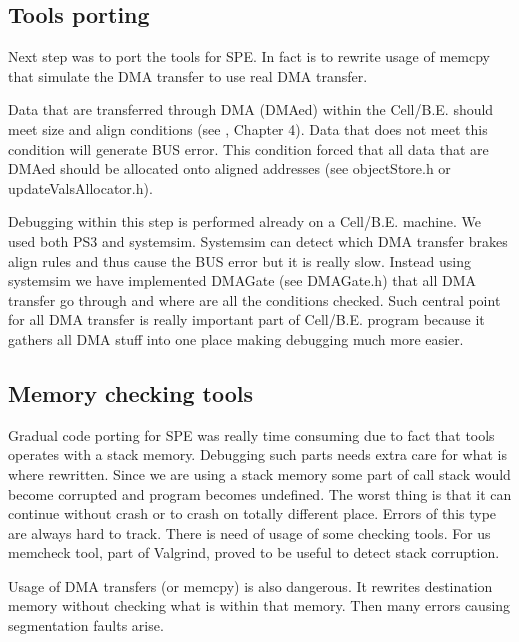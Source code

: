 \subsection{Tools porting}

\par
Next step was to port the tools for SPE.
In fact is to rewrite usage of memcpy that simulate the DMA transfer to use real DMA transfer.

\par
Data that are transferred through DMA (DMAed) within the \mbox{Cell/B.E.} should meet size and align conditions (see \cite{programmersGuide}, Chapter 4).
Data that does not meet this condition will generate BUS error.
This condition forced that all data that are DMAed should be allocated onto aligned addresses (see objectStore.h or updateValsAllocator.h).

\par
Debugging within this step is performed already on a \mbox{Cell/B.E.} machine.
We used both PS3 and systemsim.
Systemsim can detect which DMA transfer brakes align rules and thus cause the BUS error but it is really slow.
Instead using systemsim we have implemented DMAGate (see DMAGate.h) that all DMA transfer go through and where are all the conditions checked.
Such central point for all DMA transfer is really important part of \mbox{Cell/B.E.} program because it gathers all DMA stuff into one place making debugging much more easier.

\subsection{Memory checking tools}

\par
Gradual code porting for SPE was really time consuming due to fact that tools operates with a stack memory.
Debugging such parts needs extra care for what is where rewritten.
Since we are using a stack memory some part of call stack would become corrupted and program becomes undefined.
The worst thing is that it can continue without crash or to crash on totally different place.
Errors of this type are always hard to track.
There is need of usage of some checking tools.
For us memcheck tool, part of Valgrind, proved to be useful to detect stack corruption.

\par
Usage of DMA transfers (or memcpy) is also dangerous.
It rewrites destination memory without checking what is within that memory.
Then many errors causing segmentation faults arise.

